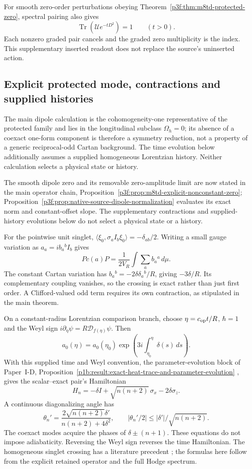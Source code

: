 \documentclass[11pt,a4paper]{article}
\begin{document}
For smooth zero-order perturbations obeying
Theorem~\ref{p3f:thm:m8td-protected-zero}, spectral pairing also gives
\[
 \operatorname{Tr}(\mathcal Ue^{-tD^2})=1\qquad(t>0).
\]
Each nonzero graded pair cancels and the graded zero multiplicity is the
index. This supplementary inserted readout does not replace the source's
uninserted action.

\subsection{Explicit protected mode, contractions and supplied histories}
\label{p3f:app:m8td-examples}
The main dipole calculation is the cohomogeneity-one representative of the
protected family and lies in the longitudinal subclass $\Omega_h=0$; its
absence of a coexact one-form component is therefore a symmetry reduction,
not a property of a generic reciprocal-odd Cartan background. The time
evolution below additionally assumes a supplied homogeneous Lorentzian
history. Neither calculation selects a physical state or history.

The smooth dipole zero and its removable zero-amplitude limit are now
stated in the main operator chain,
Proposition~\ref{p3f:prop:m8td-explicit-nonconstant-zero};
Proposition~\ref{p3f:prop:native-source-dipole-normalization}
evaluates its exact norm and constant-offset slope. The supplementary
contractions and supplied-history evolutions below do not select a
physical state or a history.

For the pointwise unit singlet,
$\langle\xi_0,\sigma_aI_b\xi_0\rangle=-\delta_{ab}/2$.
Writing a small gauge variation as $a_a=i b_a{}^bI_b$ gives
\[
 Pc(a)P=\frac1{2V_R}\int\sum_a b_a{}^a\,d\mu.
\]
The constant Cartan variation has $b_a{}^b=-2\delta\delta_a{}^b/R$,
giving $-3\delta/R$. Its complementary coupling vanishes, so the
crossing is exact rather than just first order. A Clifford-valued odd
term requires its own contraction, as stipulated in the main theorem.

On a constant-radius Lorentzian comparison branch, choose
$\eta=c_{\rm op}t/R$, $\hbar=1$ and the Weyl sign
$i\partial_\eta\psi=R\mathcal D_{f(\eta)}\psi$. Then
\[
 a_0(\eta)=a_0(\eta_0)\exp\left(3i\int_{\eta_0}^{\eta}\delta(s)\,ds\right).
\]
With this supplied time and Weyl convention, the parameter-evolution
block of Paper~I-D,
Proposition~\ref{p1b:result:exact-heat-trace-and-parameter-evolution}
\cite{Kugelmann2026Paper1D}, gives the scalar--exact pair's Hamiltonian
\[
 H_n=-\delta I+\sqrt{n(n+2)}\,\sigma_x-2\delta\sigma_z.
\]
A continuous diagonalizing angle has
\[
 \theta_n'=\frac{2\sqrt{n(n+2)}\delta'}{n(n+2)+4\delta^2},\qquad
 |\theta_n'/2|\le|\delta'|/\sqrt{n(n+2)}.
\]
The coexact modes acquire the phases of $\delta\pm(n+1)$. These equations
do not impose adiabaticity. Reversing the Weyl sign reverses the time
Hamiltonian. The homogeneous singlet crossing has a literature precedent
\cite{GibbonsSteif1993Sphalerons}; the formulas here follow from the
explicit retained operator and the full Hodge spectrum.
\end{document}
